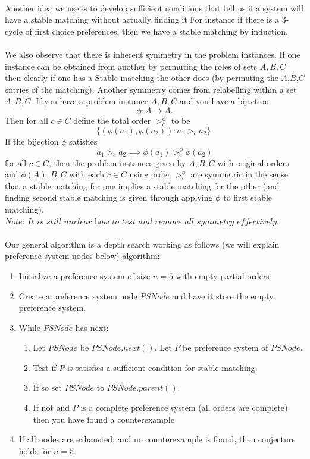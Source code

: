 \documentclass[letterpaper,12pt,oneside,onecolumn]{article}
\begin{document}
\paragraph{}
Another idea we use is to develop sufficient conditions that tell us if a system will have a stable matching without actually finding it For instance if there is a $3$-cycle of first choice preferences, then we have a stable matching by induction.
\paragraph{}
We also observe that there is inherent symmetry in the problem instances. If one instance can be obtained from another by permuting the roles of sets $A,B,C$ then clearly if one has a Stable matching the other does (by permuting the $A$,$B$,$C$ entries of the matching). Another symmetry comes from relabelling within a set $A, B, C$. If you have a problem instance $A,B,C$ and you have a bijection
$$\phi: A \rightarrow A.$$
Then for all $c \in C$ define the total order $>_c^\phi$ to be
$$\{(\phi(a_1),\phi(a_2)) : a_1 >_c a_2 \}.$$
If the bijection $\phi$ satisfies
$$a_1 >_c a_2 \implies \phi(a_1) >^\phi_c \phi(a_2)$$
for all $c \in C$, then the problem instances given by $A,B,C$ with original orders and $\phi(A), B, C$ with each $c\in C$ using order $>_c^\phi$ are symmetric in the sense that a stable matching for one implies a stable matching for the other (and finding second stable matching is given through applying $\phi$ to first stable matching). $\textit{Note: It is still unclear how to test and remove all symmetry effectively}$.
\paragraph{}
Our general algorithm is a depth search working as follows (we will explain preference system nodes below) algorithm:
\begin{enumerate}
\item Initialize a preference system of size $n=5$ with empty partial orders
\item Create a preference system node $PSNode$ and have it store the empty preference system.
\item While $PSNode$ has next:
\begin{enumerate}
\item Let $PSNode$ be $PSNode.next()$. Let $P$ be preference system of $PSNode$.
\item Test if $P$ is satisfies a sufficient condition for stable matching.
\item If so set $PSNode$ to $PSNode.parent()$.
\item If not and $P$ is a complete preference system (all orders are complete) then you have found a counterexample
\end{enumerate}
\item If all nodes are exhausted, and no counterexample is found, then conjecture holds for $n=5$.
\end{enumerate}
\end{document}

